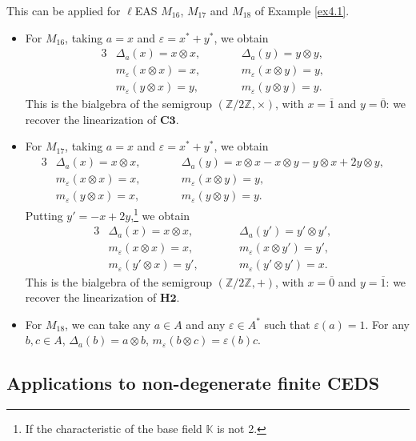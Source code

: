 \documentclass[pdftex]{sigma}
\numberwithin{equation}{section}
\begin{document}
\begin{Example}
This can be applied for $\ell$EAS $M_{16}$, $M_{17}$ and $M_{18}$ of Example \ref{ex4.1}.
\begin{itemize}
\item For $M_{16}$, taking $a=x$ and $\varepsilon=x^*+y^*$, we obtain
\begin{alignat*}{3}
&\Delta_a(x)=x\otimes x,\qquad&&\Delta_a(y)=y\otimes y,&\\
&m_\varepsilon(x\otimes x)=x,\qquad&& m_\varepsilon(x\otimes y)=y,&\\
&m_\varepsilon(y\otimes x)=y,\qquad&& m_\varepsilon(y\otimes y)=y.&
\end{alignat*}
This is the bialgebra of the semigroup $(\mathbb{Z}/2\mathbb{Z},\times)$, with $x=\overline{1}$ and $y=\overline{0}$:
we recover the linearization of $\mathbf{C3}$.
\item For $M_{17}$, taking $a=x$ and $\varepsilon=x^*+y^*$, we obtain
\begin{alignat*}{3}
&\Delta_a(x)=x\otimes x,\qquad&&\Delta_a(y)=x\otimes x-x\otimes y-y\otimes x+2y\otimes y,&\\
&m_\varepsilon(x\otimes x)=x,\qquad&& m_\varepsilon(x\otimes y)=y,&\\
&m_\varepsilon(y\otimes x)=x,\qquad&& m_\varepsilon(y\otimes y)=y.&
\end{alignat*}
Putting $y'=-x+2y$,\footnote{If the characteristic of the base field $\mathbb{K}$ is not 2.} we obtain
\begin{alignat*}{3}
&\Delta_a(x)=x\otimes x,\qquad&&\Delta_a(y')=y'\otimes y',&\\
&m_\varepsilon(x\otimes x)=x,\qquad&& m_\varepsilon(x\otimes y')=y',&\\
&m_\varepsilon(y'\otimes x)=y',\qquad&& m_\varepsilon(y'\otimes y')=x.&
\end{alignat*}
This is the bialgebra of the semigroup $(\mathbb{Z}/2\mathbb{Z},+)$, with $x=\overline{0}$ and $y=\overline{1}$:
we recover the linearization of $\mathbf{H2}$.
\item For $M_{18}$, we can take any $a\in A$ and any $\varepsilon\in A^*$ such that $\varepsilon(a)=1$. For any $b,c\in A$,
$
\Delta_a(b)=a\otimes b$, $ m_\varepsilon(b\otimes c)=\varepsilon(b)c$.
\end{itemize}\end{Example}


\subsection{Applications to non-degenerate finite CEDS}
\end{document}
